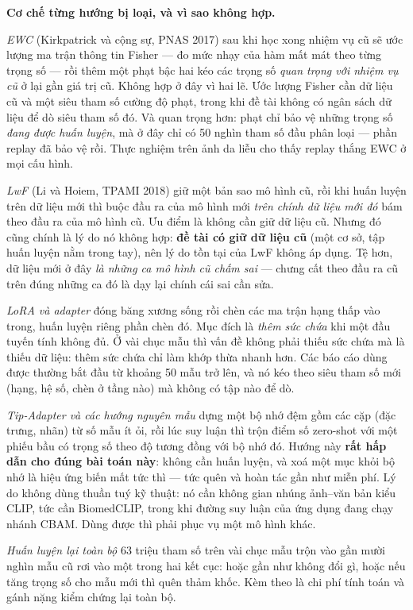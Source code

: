 \documentclass[11pt,a4paper]{article}
\begin{document}
\textbf{Cơ chế từng hướng bị loại, và vì sao không hợp.}

\textit{EWC} (Kirkpatrick và cộng sự, PNAS 2017) sau khi học xong nhiệm vụ cũ sẽ ước lượng ma trận
thông tin Fisher --- đo mức nhạy của hàm mất mát theo từng trọng số --- rồi thêm một phạt bậc hai
kéo các trọng số \emph{quan trọng với nhiệm vụ cũ} ở lại gần giá trị cũ. Không hợp ở đây vì hai lẽ.
Ước lượng Fisher cần dữ liệu cũ và một siêu tham số cường độ phạt, trong khi đề tài không có ngân
sách dữ liệu để dò siêu tham số đó. Và quan trọng hơn: phạt chỉ bảo vệ những trọng số \emph{đang
được huấn luyện}, mà ở đây chỉ có 50 nghìn tham số đầu phân loại --- phần replay đã bảo vệ rồi.
Thực nghiệm trên ảnh da liễu cho thấy replay thắng EWC ở mọi cấu hình.

\textit{LwF} (Li và Hoiem, TPAMI 2018) giữ một bản sao mô hình cũ, rồi khi huấn luyện trên dữ liệu
mới thì buộc đầu ra của mô hình mới \emph{trên chính dữ liệu mới đó} bám theo đầu ra của mô hình cũ.
Ưu điểm là không cần giữ dữ liệu cũ. Nhưng đó cũng chính là lý do nó không hợp: \textbf{đề tài có
giữ dữ liệu cũ} (một cơ sở, tập huấn luyện nằm trong tay), nên lý do tồn tại của LwF không áp dụng.
Tệ hơn, dữ liệu mới ở đây \emph{là những ca mô hình cũ chấm sai} --- chưng cất theo đầu ra cũ trên
đúng những ca đó là dạy lại chính cái sai cần sửa.

\textit{LoRA và adapter} đóng băng xương sống rồi chèn các ma trận hạng thấp vào trong, huấn luyện
riêng phần chèn đó. Mục đích là \emph{thêm sức chứa} khi một đầu tuyến tính không đủ. Ở vài chục
mẫu thì vấn đề không phải thiếu sức chứa mà là thiếu dữ liệu: thêm sức chứa chỉ làm khớp thừa nhanh
hơn. Các báo cáo dùng được thường bắt đầu từ khoảng 50 mẫu trở lên, và nó kéo theo siêu tham số mới
(hạng, hệ số, chèn ở tầng nào) mà không có tập nào để dò.

\textit{Tip-Adapter và các hướng nguyên mẫu} dựng một bộ nhớ đệm gồm các cặp (đặc trưng, nhãn) từ
số mẫu ít ỏi, rồi lúc suy luận thì trộn điểm số zero-shot với một phiếu bầu có trọng số theo độ
tương đồng với bộ nhớ đó. Hướng này \textbf{rất hấp dẫn cho đúng bài toán này}: không cần huấn
luyện, và xoá một mục khỏi bộ nhớ là hiệu ứng biến mất tức thì --- tức quên và hoàn tác gần như
miễn phí. Lý do không dùng thuần tuý kỹ thuật: nó cần không gian nhúng ảnh--văn bản kiểu CLIP, tức
cần BiomedCLIP, trong khi đường suy luận của ứng dụng đang chạy nhánh CBAM. Dùng được thì phải phục
vụ một mô hình khác.

\textit{Huấn luyện lại toàn bộ} 63 triệu tham số trên vài chục mẫu trộn vào gần mười nghìn mẫu cũ
rơi vào một trong hai kết cục: hoặc gần như không đổi gì, hoặc nếu tăng trọng số cho mẫu mới thì
quên thảm khốc. Kèm theo là chi phí tính toán và gánh nặng kiểm chứng lại toàn bộ.
\end{document}
